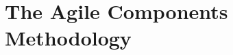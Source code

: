 \documentclass[pdf,ps2pdf,12pt,report]{SANDreport}
\theoremstyle{plain}
\theoremstyle{definition}
\theoremstyle{remark}
\numberwithin{equation}{section}
\begin{document}


    \SANDmain		%

\section{The Agile Components Methodology}
\end{document}
